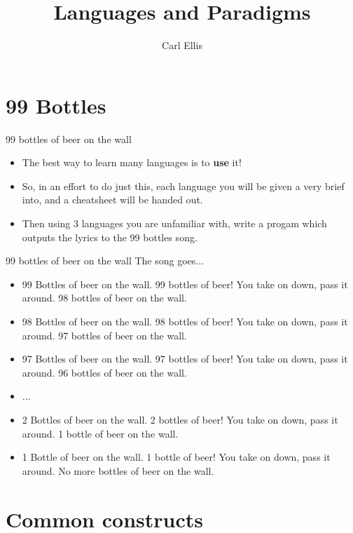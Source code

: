 \documentclass[10pt]{beamer}
\title{Languages and Paradigms}
\author[C. Ellis]{Carl Ellis}
\institute[LANCS]{
	Lancaster University \\
  Lancaster, UK
}
\begin{document}
\begin{frame}    
	\titlepage
\end{frame}

\section{99 Bottles}

\begin{frame}{99 bottles of beer on the wall}
  \begin{itemize}
    \item The best way to learn many languages is to \textbf{use} it! 
    \item So, in an effort to do just this, each language you will be given a very brief into, and a cheatsheet will be handed out.
    \item Then using 3 languages you are unfamiliar with, write a progam which outputs the lyrics to the 99 bottles song.
  \end{itemize}
\end{frame}

\begin{frame}{99 bottles of beer on the wall}
  The song goes...
    \begin{itemize}
      \item 99 Bottles of beer on the wall. 99 bottles of beer! You take on down, pass it around. 98 bottles of beer on the wall.
      \item 98 Bottles of beer on the wall. 98 bottles of beer! You take on down, pass it around. 97 bottles of beer on the wall.
      \item 97 Bottles of beer on the wall. 97 bottles of beer! You take on down, pass it around. 96 bottles of beer on the wall.
      \item ...
      \item 2 Bottles of beer on the wall. 2 bottles of beer! You take on down, pass it around. 1 bottle of beer on the wall.
      \item 1 Bottle of beer on the wall. 1 bottle of beer! You take on down, pass it around. No more bottles of beer on the wall.
    \end{itemize}
\end{frame}

\section{Common constructs}
\end{document}
